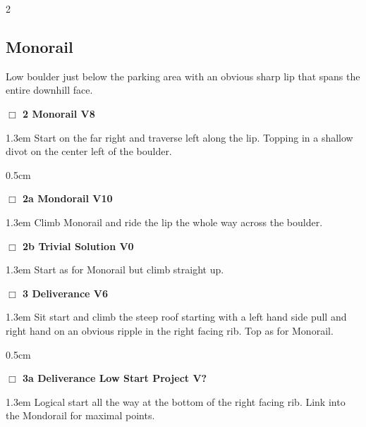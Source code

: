 \begin{multicols}{2}
\subsection*{Monorail}\label{bf:Monorail}
Low boulder just below the parking area with an obvious sharp lip that spans the entire downhill face.\\
\needspace{2em}
\label{rt:Monorail}
\colorbox{Goldenrod!20}{
\parbox{0.95\linewidth}{
\hspace{-1ex}\textbf{$\Box$
2 Monorail V8  
}}}
\begin{adjustwidth}{1.3em}{}			
Start on the far right and traverse left along the lip. Topping in a shallow divot on the center left of the boulder.
\end{adjustwidth}
\begin{adjustwidth}{0.5cm}{}				
\needspace{4em}
\needspace{2em}
\label{vr:Monorail Extension Project}
\colorbox{red!20}{
\parbox{0.95\linewidth}{
\hspace{-1ex}\textbf{$\Box$
2a Mondorail V10  
}}}
\begin{adjustwidth}{1.3em}{}			
Climb Monorail and ride the lip the whole way across the boulder.
\end{adjustwidth}
\needspace{2em}
\label{vr:Trivial Solution}
\colorbox{green!20}{
\parbox{0.95\linewidth}{
\hspace{-1ex}\textbf{$\Box$
2b Trivial Solution V0  
}}}
\begin{adjustwidth}{1.3em}{}			
Start as for Monorail but climb straight up.
\end{adjustwidth}
\end{adjustwidth}
\needspace{2em}
\label{rt:Deliverance}
\colorbox{RoyalBlue!20}{
\parbox{0.95\linewidth}{
\hspace{-1ex}\textbf{$\Box$
3 Deliverance V6  
}}}
\begin{adjustwidth}{1.3em}{}			
Sit start and climb the steep roof starting with a left hand side pull and right hand on an obvious ripple in the right facing rib. Top as for Monorail.
\end{adjustwidth}
\begin{adjustwidth}{0.5cm}{}				
\needspace{4em}
\needspace{2em}
\label{vr:Deliverance Low}
\colorbox{black!20}{
\parbox{0.95\linewidth}{
\hspace{-1ex}\textbf{$\Box$
3a Deliverance Low Start Project V?  
}}}
\begin{adjustwidth}{1.3em}{}			
Logical start all the way at the bottom of the right facing rib. Link into the Mondorail for maximal points.
\end{adjustwidth}
\end{adjustwidth}
	\end{multicols}
